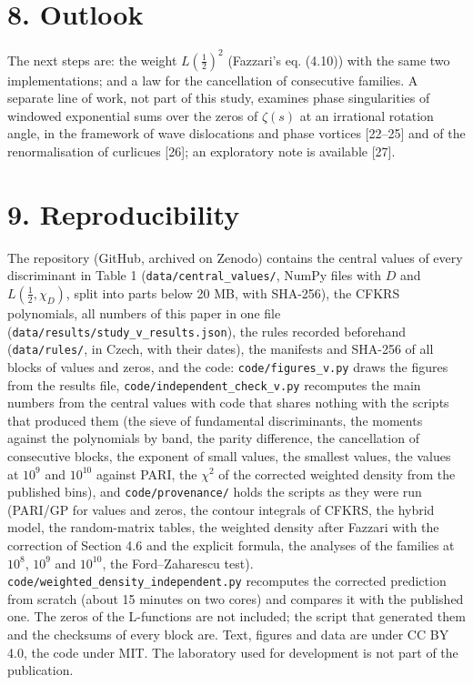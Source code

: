 \documentclass[
  10pt,
]{article}
\begin{document}
\hypertarget{outlook}{%
\section{8. Outlook}\label{outlook}}

The next steps are: the weight \(L(\tfrac12)^2\) (Fazzari's eq. (4.10))
with the same two implementations; and a law for the cancellation of
consecutive families. A separate line of work, not part of this study,
examines phase singularities of windowed exponential sums over the zeros
of \(\zeta(s)\) at an irrational rotation angle, in the framework of
wave dislocations and phase vortices {[}22--25{]} and of the
renormalisation of curlicues {[}26{]}; an exploratory note is available
{[}27{]}.

\hypertarget{reproducibility}{%
\section{9. Reproducibility}\label{reproducibility}}

The repository (GitHub, archived on Zenodo) contains the central values
of every discriminant in Table 1 (\texttt{data/central\_values/}, NumPy
files with \(D\) and \(L(\tfrac12, \chi_D)\), split into parts below 20
MB, with SHA-256), the CFKRS polynomials, all numbers of this paper in
one file (\texttt{data/results/study\_v\_results.json}), the rules
recorded beforehand (\texttt{data/rules/}, in Czech, with their dates),
the manifests and SHA-256 of all blocks of values and zeros, and the
code: \texttt{code/figures\_v.py} draws the figures from the results
file, \texttt{code/independent\_check\_v.py} recomputes the main numbers
from the central values with code that shares nothing with the scripts
that produced them (the sieve of fundamental discriminants, the moments
against the polynomials by band, the parity difference, the cancellation
of consecutive blocks, the exponent of small values, the smallest
values, the values at \(10^9\) and \(10^{10}\) against PARI, the
\(\chi^2\) of the corrected weighted density from the published bins),
and \texttt{code/provenance/} holds the scripts as they were run
(PARI/GP for values and zeros, the contour integrals of CFKRS, the
hybrid model, the random-matrix tables, the weighted density after
Fazzari with the correction of Section 4.6 and the explicit formula, the
analyses of the families at \(10^8\), \(10^9\) and \(10^{10}\), the
Ford--Zaharescu test). \texttt{code/weighted\_density\_independent.py}
recomputes the corrected prediction from scratch (about 15 minutes on
two cores) and compares it with the published one. The zeros of the
L-functions are not included; the script that generated them and the
checksums of every block are. Text, figures and data are under CC BY
4.0, the code under MIT. The laboratory used for development is not part
of the publication.
\end{document}
